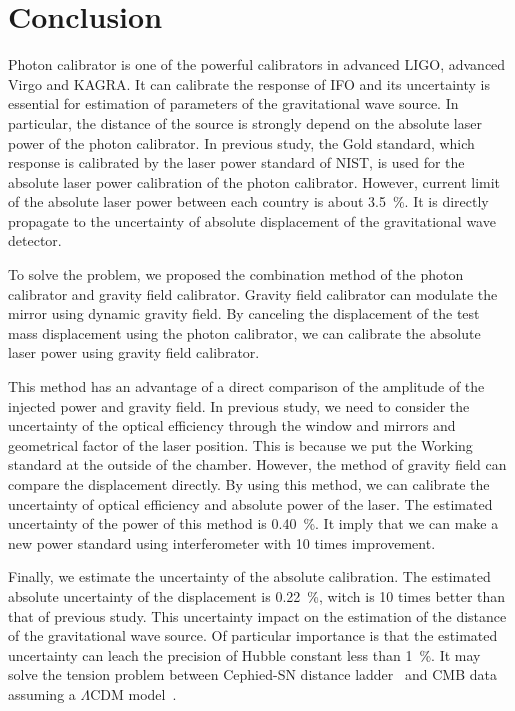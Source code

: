 \documentclass[A4]{spie}  %
\begin{document}
\section{Conclusion}
Photon calibrator is one of the powerful calibrators in advanced LIGO, advanced Virgo and KAGRA. It can calibrate the response of IFO and its uncertainty is essential for estimation of parameters of the gravitational wave source. In particular, the distance of the source is strongly depend on the absolute laser power of the photon calibrator. In previous study, the Gold standard, which response is calibrated by the laser power standard of NIST, is used for the absolute laser power calibration of the photon calibrator. However, current limit of the absolute laser power between each country is about 3.5~\%. It is directly propagate to the uncertainty of absolute displacement of the gravitational wave detector.

To solve the problem, we proposed the combination method of the photon calibrator and gravity field calibrator. Gravity field calibrator can modulate the mirror using dynamic gravity field. By canceling the displacement of the test mass displacement using the photon calibrator, we can calibrate the absolute laser power using gravity field calibrator.

This method has an advantage of a direct comparison of the amplitude of the injected power and gravity field. In previous study, we need to consider the uncertainty of the optical efficiency through the window and mirrors  and geometrical factor of the laser position. This is because we put the Working standard at the outside of the chamber. However, the method of gravity field can compare the displacement directly. By using this method, we can calibrate the uncertainty of optical efficiency and absolute power of the laser.  The estimated uncertainty of the power of this method is 0.40~\%. It imply that we can make a new power standard using interferometer with 10 times improvement.

Finally, we estimate the uncertainty of the absolute calibration. The estimated absolute uncertainty of the displacement is 0.22~\%, witch is 10 times better than that of previous study. This uncertainty impact on the estimation of the distance of the gravitational wave source. Of particular importance is that the estimated uncertainty can leach the precision of Hubble constant less than 1~\%. It may solve the tension problem between Cephied-SN distance ladder~\cite{Riess_2016} and CMB data assuming a $\Lambda$CDM 
model~\cite{2016-planck}.
\acknowledgments     %
 
\end{document}
